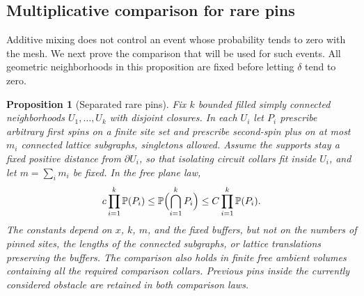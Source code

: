 \documentclass[11pt]{article}
\newcommand{\Prob}{\mathbb P}
\newtheorem{proposition}[theorem]{Proposition}
\theoremstyle{definition}
\theoremstyle{remark}
\numberwithin{equation}{section}
\begin{document}
\subsection{Multiplicative comparison for rare pins}

Additive mixing does not control an event whose probability tends to zero
with the mesh. We next prove the comparison that will be used for such
events. All geometric neighborhoods in this proposition are fixed before
letting $\delta$ tend to zero.

\begin{proposition}[Separated rare pins]\label{prop:rare-pins}
Fix $k$ bounded filled simply connected neighborhoods $U_1,\ldots,U_k$
with disjoint closures. In each $U_i$ let $P_i$ prescribe arbitrary first
spins on a finite site set and prescribe second-spin plus on at most
$m_i$ connected lattice subgraphs, singletons allowed. Assume the
supports stay a fixed positive distance from $\partial U_i$, so that
isolating circuit collars fit inside $U_i$, and let $m=\sum_i m_i$ be
fixed. In the free plane law,
\begin{equation}\label{discrete:rare-pins}
 c\prod_{i=1}^k\Prob(P_i)
 \le \Prob\Bigl(\bigcap_{i=1}^kP_i\Bigr)
 \le C\prod_{i=1}^k\Prob(P_i).
\end{equation}
The constants depend on $x$, $k$, $m$, and the fixed buffers, but not on
the numbers of pinned sites, the lengths of the connected subgraphs, or
lattice translations preserving the buffers. The comparison also holds
in finite free ambient volumes containing all the required comparison
collars. Previous pins inside the currently considered obstacle are
retained in both comparison laws.
\end{proposition}
\end{document}
